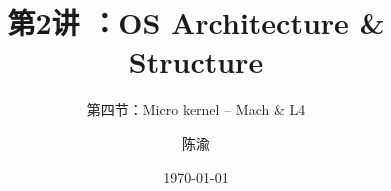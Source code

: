 


\title[第1讲]{第2讲 ：OS Architecture \& Structure} %
\subtitle{第四节：Micro kernel -- Mach \& L4 }
\author{陈渝} %
\date{\today} %




\begin{frame}
\titlepage %
\end{frame}

%
%

